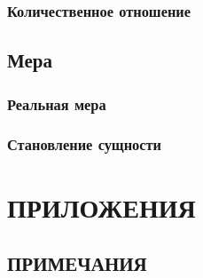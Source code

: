 \documentclass[a5paper, 11pt, twoside, onecolumn, openany]{memoir}
\begin{document}
\section{Количественное отношение}


\chapter{Мера}



\section{Реальная мера}


\section{Становление сущности}


\backmatter


\part*{ПРИЛОЖЕНИЯ}


\chapter[\mdseries Примечания]{ПРИМЕЧАНИЯ}


\clearpage
\tableofcontents*
\clearpage
\end{document}
